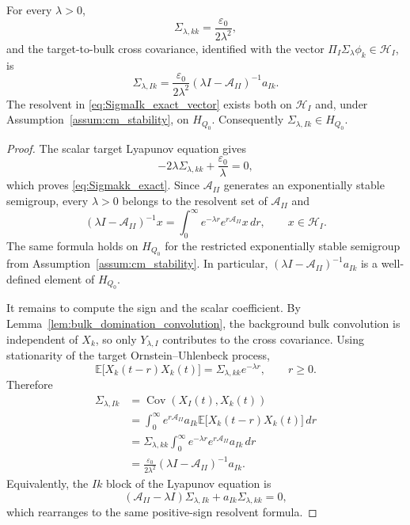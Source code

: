 \begin{lemma}
\label{lem:block_lyapunov_identities}
For every $\lambda>0$,
\begin{equation}
  \Sigma_{\lambda,kk}=\frac{\varepsilon_0}{2\lambda^2},
  \label{eq:Sigmakk_exact}
\end{equation}
and the target-to-bulk cross covariance, identified with the vector
$\Pi_I\Sigma_\lambda\phi_k\in\mathcal{H}_I$, is
\begin{equation}
  \Sigma_{\lambda,Ik}
  =\frac{\varepsilon_0}{2\lambda^2}
    (\lambda I-\mathcal{A}_{II})^{-1}a_{Ik}.
  \label{eq:SigmaIk_exact_vector}
\end{equation}
The resolvent in \eqref{eq:SigmaIk_exact_vector} exists both on
$\mathcal{H}_I$ and, under Assumption~\ref{assum:cm_stability}, on
$H_{Q_0}$.  Consequently $\Sigma_{\lambda,Ik}\in H_{Q_0}$.
\end{lemma}

\begin{proof}
The scalar target Lyapunov equation gives
\[
  -2\lambda\Sigma_{\lambda,kk}+\frac{\varepsilon_0}{\lambda}=0,
\]
which proves \eqref{eq:Sigmakk_exact}.  Since $\mathcal{A}_{II}$ generates an
exponentially stable semigroup, every $\lambda>0$ belongs to the resolvent set
of $\mathcal{A}_{II}$ and
\begin{equation}
  (\lambda I-\mathcal{A}_{II})^{-1}x
  =
  \int_0^\infty e^{-\lambda r}e^{r\mathcal{A}_{II}}x\,dr,
  \qquad x\in\mathcal{H}_I.
  \label{eq:resolvent_laplace_HI}
\end{equation}
The same formula holds on $H_{Q_0}$ for the restricted exponentially stable
semigroup from Assumption~\ref{assum:cm_stability}.  In particular,
$(\lambda I-\mathcal{A}_{II})^{-1}a_{Ik}$ is a well-defined element of
$H_{Q_0}$.

It remains to compute the sign and the scalar coefficient.  By
Lemma~\ref{lem:bulk_domination_convolution}, the background bulk convolution is
independent of $X_k$, so only $Y_{\lambda,I}$ contributes to the cross covariance.
Using stationarity of the target Ornstein--Uhlenbeck process,
\[
  \mathbb{E}\bigl[X_k(t-r)X_k(t)\bigr]
  =\Sigma_{\lambda,kk}e^{-\lambda r},
  \qquad r\ge0.
\]
Therefore
\begin{align*}
  \Sigma_{\lambda,Ik}
  &=\operatorname{Cov}(X_I(t),X_k(t))                                      \\
  &=\int_0^\infty e^{r\mathcal{A}_{II}}a_{Ik}
     \mathbb{E}\bigl[X_k(t-r)X_k(t)\bigr] \,dr                              \\
  &=\Sigma_{\lambda,kk}
    \int_0^\infty e^{-\lambda r}e^{r\mathcal{A}_{II}}a_{Ik}\,dr              \\
  &=\frac{\varepsilon_0}{2\lambda^2}
    (\lambda I-\mathcal{A}_{II})^{-1}a_{Ik}.
\end{align*}
Equivalently, the $Ik$ block of the Lyapunov equation is
\[
  (\mathcal{A}_{II}-\lambda I)\Sigma_{\lambda,Ik}
  +a_{Ik}\Sigma_{\lambda,kk}=0,
\]
which rearranges to the same positive-sign resolvent formula.
\end{proof}


